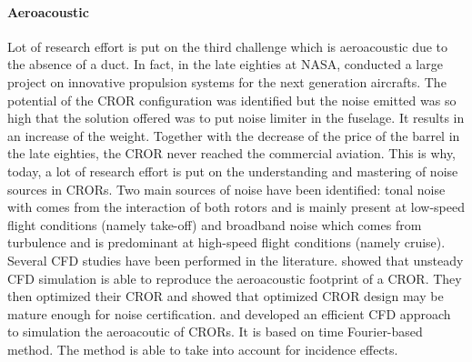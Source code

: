 \paragraph{Aeroacoustic}
Lot of research effort is put on the third challenge which
is aeroacoustic due to the absence of a duct. 
In fact, in the late eighties at NASA, \citet{Hager1988}
conducted a large project on innovative propulsion systems for the
next generation aircrafts. The potential of the CROR configuration
was identified but the noise emitted was so high that the solution
offered was to put noise limiter in the fuselage. It results in 
an increase of the weight. Together with the decrease of the price of the
barrel in the late eighties, the CROR never reached the commercial
aviation. This is why, today, a lot of research effort is put on the
understanding and mastering of noise sources in CRORs.
Two main sources of noise have been identified: tonal noise with comes from
the interaction of both rotors and is mainly present at low-speed flight conditions 
(namely take-off)
and broadband noise which comes from turbulence and is predominant
at high-speed flight conditions (namely cruise).
Several CFD studies have been performed in the literature.
\citet{Peters2012} showed that unsteady CFD simulation is able
to reproduce the aeroacoustic footprint of a CROR. They then optimized
their CROR and showed that optimized CROR design may be mature enough
for noise certification. \citet{Hoffer2012} and \citet{Ferrante2013}
developed an efficient CFD approach to simulation the aeroacoutic of CRORs.
It is based on time Fourier-based method. The method is able to
take into account for incidence effects.

